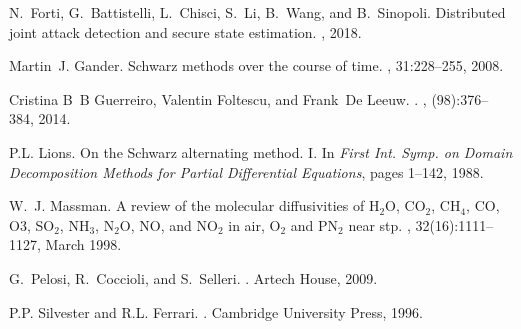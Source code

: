 \documentclass[journal]{IEEEtran}
\begin{document}
\begin{thebibliography}{99}
N.~Forti, G.~Battistelli, L.~Chisci, S.~Li, B.~Wang, and B.~Sinopoli.
\newblock Distributed joint attack detection and secure state estimation.
, 2018.

Martin~J. Gander.
\newblock Schwarz methods over the course of time.
,
  31:228--255, 2008.

Cristina B~B Guerreiro, Valentin Foltescu, and Frank~De Leeuw.
.
, (98):376--384, 2014.

P.L. Lions.
\newblock On the {S}chwarz alternating method. {I}.
\newblock In {\em First Int. Symp. on Domain Decomposition Methods for Partial
  Differential Equations}, pages 1--142, 1988.

W.~J. Massman.
\newblock A review of the molecular diffusivities of {H$_2$O}, {CO$_2$},
  {CH$_4$}, {CO}, {O3}, {SO$_2$}, {NH$_3$}, {N$_2$O}, {NO}, and {NO$_2$} in
  air, {O$_2$} and {PN$_2$} near stp.
, 32(16):1111--1127, March 1998.

G.~Pelosi, R.~Coccioli, and S.~Selleri.
.
\newblock Artech House, 2009.

P.P. Silvester and R.L. Ferrari.
.
\newblock Cambridge University Press, 1996.
%
\end{thebibliography}

% 
\end{document}
